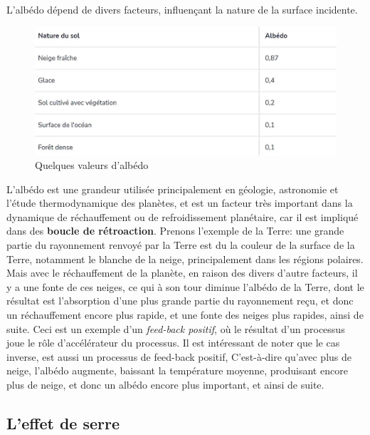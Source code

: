 \documentclass[11pt,a4paper]{article}
\begin{document}
L'albédo dépend de divers facteurs, influençant la nature de la surface incidente. 
\vspace{0.5cm}
\begin{figure}[h]
    \centering
    \includegraphics[width=0.8\linewidth]{imgs/p4/albedotable.jpg}
    \caption{Quelques valeurs d'albédo}
\end{figure}
\vspace{1cm}
\begin{rmrq}
L'albédo est une grandeur utilisée principalement en géologie, astronomie et l'étude thermodynamique des planètes, et est un facteur très important dans la dynamique de réchauffement ou de refroidissement planétaire, car il est impliqué dans des \textbf{boucle de rétroaction}. Prenons l'exemple de la Terre: une grande partie du rayonnement renvoyé par la Terre est du la couleur de la surface de la Terre, notamment le blanche de la neige, principalement dans les régions polaires. Mais avec le réchauffement de la planète, en raison des divers d'autre facteurs, il y a une fonte de ces neiges, ce qui à son tour diminue l'albédo de la Terre, dont le résultat est l'absorption d'une plus grande partie du rayonnement reçu, et donc un réchauffement encore plus rapide, et une fonte des neiges plus rapides, ainsi de suite. Ceci est un exemple d'un \textit{feed-back positif}, où le résultat d'un processus joue le rôle d'accélérateur du processus. Il est intéressant de noter que le cas inverse, est aussi un processus de feed-back positif, C'est-à-dire qu'avec plus de neige, l'albédo augmente, baissant la température moyenne, produisant encore plus de neige, et donc un albédo encore plus important, et ainsi de suite. 
\end{rmrq}


\subsection{L'effet de serre}
\end{document}
